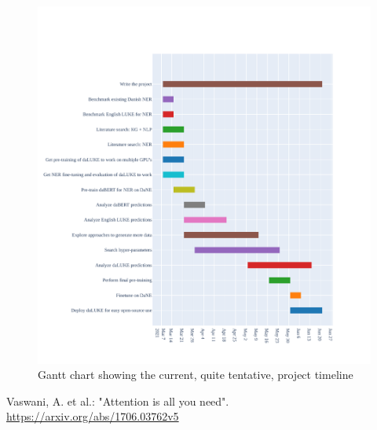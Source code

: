 \documentclass[12pt,fleqn]{article}
\begin{document}
\begin{figure}[H]
    \centering
        \includegraphics[width=\linewidth]{gantt}
        \caption{Gantt chart showing the current, quite tentative, project timeline}
    \label{fig:gantt}
\end{figure}\noindent

\begin{thebibliography}{9}
     Vaswani, A. et al.: "Attention is all you need". \url{https://arxiv.org/abs/1706.03762v5}
\end{thebibliography}
\end{document}
